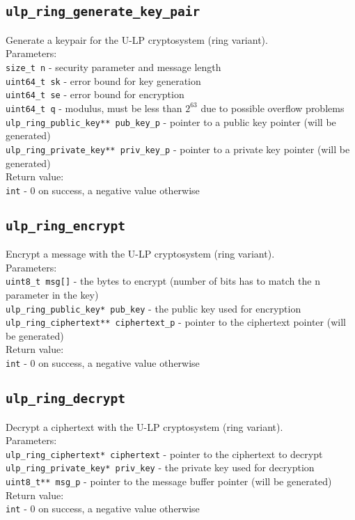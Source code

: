 \documentclass[10pt,a4paper]{article}
\begin{document}
\subsection*{\texttt{ulp\_ring\_generate\_key\_pair}}
Generate a keypair for the U-LP cryptosystem (ring variant).\\
Parameters:\\
\texttt{size\_t n} - security parameter and message length\\
\texttt{uint64\_t sk} - error bound for key generation\\
\texttt{uint64\_t se} - error bound for encryption\\
\texttt{uint64\_t q} - modulus, must be less than $2^{63}$ due to possible overflow problems\\
\texttt{ulp\_ring\_public\_key** pub\_key\_p} - pointer to a public key pointer (will be generated)\\
\texttt{ulp\_ring\_private\_key** priv\_key\_p} - pointer to a private key pointer (will be generated)\\
Return value:\\
\texttt{int} - 0 on success, a negative value otherwise

\subsection*{\texttt{ulp\_ring\_encrypt}}
Encrypt a message with the U-LP cryptosystem (ring variant).\\
Parameters:\\
\texttt{uint8\_t msg[]} - the bytes to encrypt (number of bits has to match the n parameter in the key)\\
\texttt{ulp\_ring\_public\_key* pub\_key} - the public key used for encryption\\
\texttt{ulp\_ring\_ciphertext** ciphertext\_p} - pointer to the ciphertext pointer (will be generated)\\
Return value:\\
\texttt{int} - 0 on success, a negative value otherwise

\subsection*{\texttt{ulp\_ring\_decrypt}}
Decrypt a ciphertext with the U-LP cryptosystem (ring variant).\\
Parameters:\\
\texttt{ulp\_ring\_ciphertext* ciphertext} - pointer to the ciphertext to decrypt\\
\texttt{ulp\_ring\_private\_key* priv\_key} - the private key used for decryption\\
\texttt{uint8\_t** msg\_p} - pointer to the message buffer pointer (will be generated)\\
Return value:\\
\texttt{int} - 0 on success, a negative value otherwise
\end{document}
